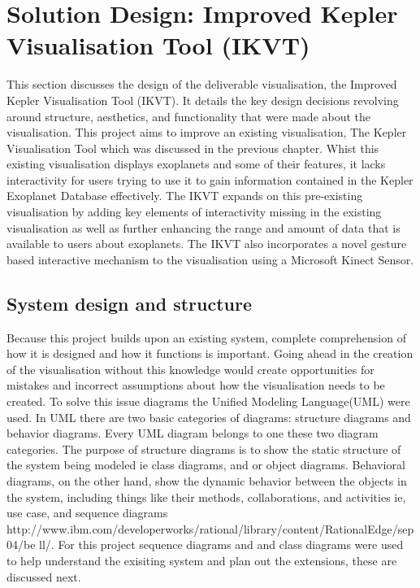 \chapter{Solution Design: Improved Kepler Visualisation Tool (IKVT)}\label{C:sd}
This section discusses the design of the deliverable visualisation, the Improved
Kepler Visualisation Tool (IKVT). It details
the key design decisions revolving around structure, aesthetics, and
functionality that were made about the visualisation. 
This project aims to improve an existing visualisation, The Kepler Visualisation
Tool which was discussed in the previous chapter. Whist this existing
visualisation displays exoplanets and some of their features, it lacks
interactivity for users trying to use it to gain information contained in the
Kepler Exoplanet Database effectively. The IKVT expands on this pre-existing
visualisation by adding key elements of interactivity missing in the existing
 visualisation as well as further enhancing the range and amount of data that
is available to users about exoplanets. The IKVT also incorporates a novel
gesture based interactive mechanism to the visualisation using a Microsoft
Kinect Sensor.

\section{System design and structure}
Because this project builds upon an existing system, complete comprehension of
how it is designed and how it functions is important. Going ahead in the
creation of the visualisation without this knowledge would create opportunities
for mistakes and incorrect assumptions about how the visualisation needs to be
created. To solve this issue diagrams the Unified Modeling Language(UML) were
used. In UML there are two basic categories of diagrams: structure diagrams and
behavior diagrams. Every UML diagram belongs to one these two diagram
categories. The purpose of structure diagrams is to show the static structure of
the system being modeled ie class diagrams, and or object diagrams. Behavioral
diagrams, on the other hand, show the dynamic behavior between the objects in
the system, including things like their methods, collaborations, and activities
ie, use case, and sequence diagrams
http://www.ibm.com/developerworks/rational/library/content/RationalEdge/sep04/be
ll/. For this project sequence diagrams and and class diagrams were used to help
understand the exisiting system and plan out the extensions, these are discussed
next.

